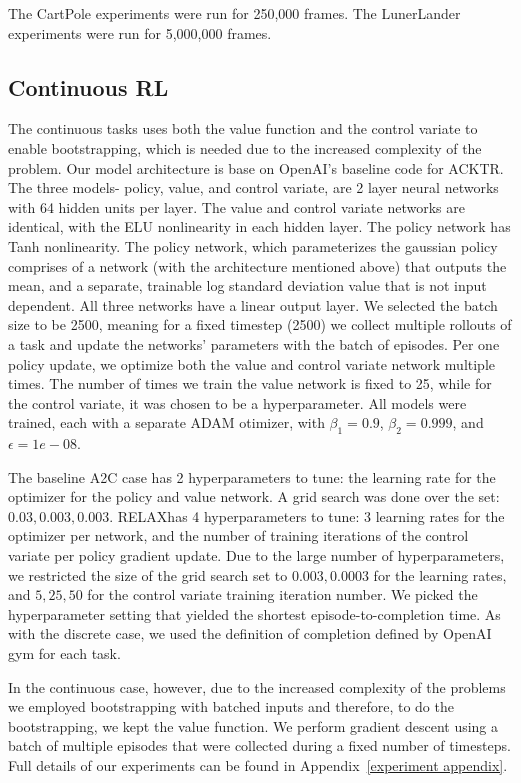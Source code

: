 \documentclass{article}
\newcommand{\RELAX}{{\textnormal{RELAX}}}
\begin{document}
The CartPole experiments were run for 250,000 frames. The LunerLander experiments were run for 5,000,000 frames. 

\subsection{Continuous RL}
The continuous tasks uses both the value function and the control variate to enable bootstrapping, which is needed due to the increased complexity of the problem. Our model architecture is base on OpenAI's baseline\cite{?} code for ACKTR\cite{?}. The three models- policy, value, and control variate, are 2 layer neural networks with 64 hidden units per layer. The value and control variate networks are identical, with the ELU nonlinearity in each hidden layer. The policy network has Tanh nonlinearity. The policy network, which parameterizes the gaussian policy comprises of a network (with the architecture mentioned above) that outputs the mean, and a separate, trainable log standard deviation value that is not input dependent. All three networks have a linear output layer. We selected the batch size to be 2500, meaning for a fixed timestep (2500) we collect multiple rollouts of a task and update the networks' parameters with the batch of episodes. Per one policy update, we optimize both the value and control variate network multiple times. The number of times we train  the value network is fixed to 25, while for the control variate, it was chosen to be a hyperparameter. 
All models were trained, each with a separate ADAM\cite{kingma2015adam} otimizer, with $\beta_1=0.9$, $\beta_2=0.999$, and $\epsilon=1e-08$. 

The baseline A2C case has 2 hyperparameters to tune: the learning rate for the optimizer for the policy and value network. A grid search was done over the set: ${0.03, 0.003, 0.003}$. \RELAX has 4 hyperparameters to tune: 3 learning rates for the optimizer per network, and the number of training iterations of the control variate per policy gradient update. Due to the large number of hyperparameters, we restricted the size of the grid search set to ${0.003, 0.0003}$ for the learning rates, and ${5, 25, 50}$ for the control variate training iteration number. We picked the hyperparameter setting that yielded the shortest episode-to-completion time. As with the discrete case, we used the definition of completion defined by OpenAI gym\cite{1606.01540} for each task. 


In the continuous case, however, due to the increased complexity of the problems we employed bootstrapping with batched inputs and therefore, to do the bootstrapping, we kept the value function. We perform gradient descent using a batch of multiple episodes that were collected during a fixed number of timesteps. Full details of our experiments can be found in Appendix~\ref{experiment appendix}.  
\end{document}
